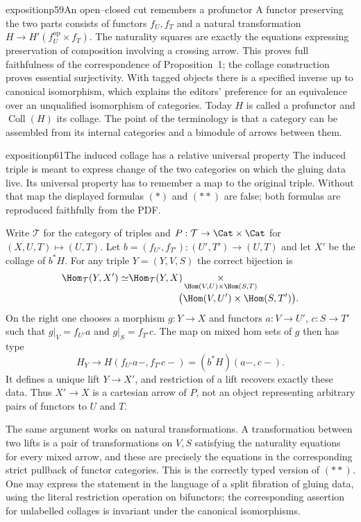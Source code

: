 \begin{dcomment}{exposition}{p59}{An open--closed cut remembers a profunctor}
A functor preserving the two parts consists of functors $f_U,f_T$ and a natural transformation $H\to H'(f_U^{\mathrm{op}}\times f_T)$. The naturality squares are exactly the equations expressing preservation of composition involving a crossing arrow. This proves full faithfulness of the correspondence of Proposition~1; the collage construction proves essential surjectivity. With tagged objects there is a specified inverse up to canonical isomorphism, which explains the editors' preference for an equivalence over an unqualified isomorphism of categories. Today $H$ is called a profunctor and $\operatorname{Coll}(H)$ its collage. The point of the terminology is that a category can be assembled from its internal categories and a bimodule of arrows between them.
\end{dcomment}

\begin{dcomment}{exposition}{p61}{The induced collage has a relative universal property}
The induced triple is meant to express change of the two categories on which the gluing data live. Its universal property has to remember a map to the original triple. Without that map the displayed formulas $(*)$ and $(**)$ are false; both formulas are reproduced faithfully from the PDF.

Write $\mathcal T$ for the category of triples and $P:\mathcal T\to\Cat\times\Cat$ for $(X,U,T)\mapsto(U,T)$. Let $b=(f_{U'},f_{T'}):(U',T')\to(U,T)$ and let $X'$ be the collage of $b^*H$. For any triple $Y=(Y,V,S)$ the correct bijection is
\[
\begin{split}
 \Hom_{\mathcal T}(Y,X')\simeq
 &\Hom_{\mathcal T}(Y,X)\mathop{\times}_{
 \Hom(V,U)\times\Hom(S,T)}\\[-2pt]
 &\hspace{18mm}\bigl(\Hom(V,U')\times\Hom(S,T')\bigr).
\end{split}
\]
On the right one chooses a morphism $g:Y\to X$ and functors $a:V\to U'$, $c:S\to T'$ such that $g|_V=f_{U'}a$ and $g|_S=f_{T'}c$. The map on mixed hom sets of $g$ then has type
\[
 H_Y\longrightarrow H(f_{U'}a-,f_{T'}c-)
                 =(b^*H)(a-,c-).
\]
It defines a unique lift $Y\to X'$, and restriction of a lift recovers exactly these data. Thus $X'\to X$ is a cartesian arrow of $P$, not an object representing arbitrary pairs of functors to $U$ and $T$.

The same argument works on natural transformations. A transformation between two lifts is a pair of transformations on $V,S$ satisfying the naturality equations for every mixed arrow, and these are precisely the equations in the corresponding strict pullback of functor categories. This is the correctly typed version of $(**)$. One may express the statement in the language of a split fibration of gluing data, using the literal restriction operation on bifunctors; the corresponding assertion for unlabelled collages is invariant under the canonical isomorphisms.


\end{dcomment}
